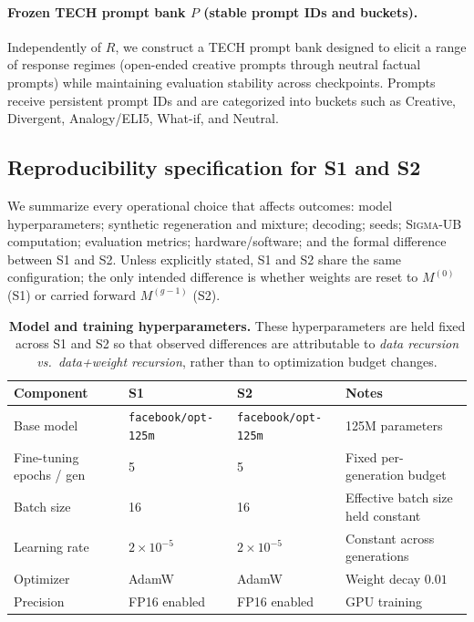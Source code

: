 \documentclass{article}
\theoremstyle{plain}
\theoremstyle{definition}
\theoremstyle{remark}
\newcommand{\sgma}{\textsc{Sigma}\xspace}
\begin{document}
\paragraph{Frozen TECH prompt bank $P$ (stable prompt IDs and buckets).}
Independently of $R$, we construct a TECH prompt bank designed to elicit a range of response regimes (open-ended creative prompts through neutral factual prompts) while maintaining evaluation stability across checkpoints. Prompts receive persistent prompt IDs and are categorized into buckets such as Creative, Divergent, Analogy/ELI5, What-if, and Neutral. 

\subsection{Reproducibility specification for S1 and S2}
\label{app:exp_card_tech}

We summarize every operational choice that affects outcomes: model hyperparameters; synthetic regeneration and mixture; decoding; seeds; \sgma-UB computation; evaluation metrics; hardware/software; and the formal difference between S1 and S2. Unless explicitly stated, S1 and S2 share the same configuration; the only intended difference is whether weights are reset to $M^{(0)}$ (S1) or carried forward $M^{(g-1)}$ (S2).

\begin{table}[t]
\centering
\footnotesize
\setlength{\tabcolsep}{7pt}
\begin{tabular}{llll}
\toprule
Component & S1 & S2 & Notes \\
\midrule
Base model & \texttt{facebook/opt-125m} & \texttt{facebook/opt-125m} & 125M parameters \\
Fine-tuning epochs / gen & 5 & 5 & Fixed per-generation budget \\
Batch size & 16 & 16 & Effective batch size held constant \\
Learning rate & $2\times 10^{-5}$ & $2\times 10^{-5}$ & Constant across generations \\
Optimizer & AdamW & AdamW & Weight decay $0.01$ \\
Precision & FP16 enabled & FP16 enabled & GPU training \\
\bottomrule
\end{tabular}
\caption{\textbf{ Model and training hyperparameters.} These hyperparameters are held fixed across S1 and S2 so that observed differences are attributable to \emph{data recursion vs.\ data+weight recursion}, rather than to optimization budget changes.}
\label{tab:repro_hparams}
\end{table}
\end{document}
